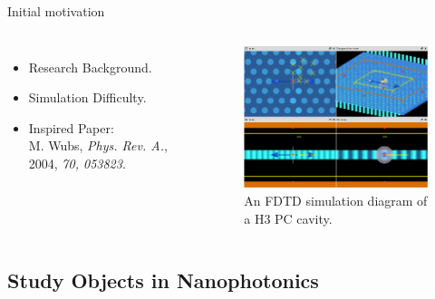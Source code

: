 \documentclass{beamer}
\begin{document}
\begin{frame}{Initial motivation}
\begin{columns}
  \begin{itemize}
  \item
    Research Background.
  \item
    Simulation Difficulty.
  \item
    Inspired Paper: \\ M. Wubs, \textit{Phys. Rev. A.}, 2004, \textit{70, 053823}.
  \end{itemize}
 
  \begin{figure}[htp]%
  \centering
  \begin{center}
  \includegraphics[width=6cm]{./Figs/FDTDsimulation}%
  \end{center}
  \caption[An FDTD simulation diagram of a H3 PC cavity.]{An FDTD simulation diagram of a H3 PC cavity.}
  \label{FDTDsimulation}
  \end{figure}
\end{columns}
\end{frame}

\subsection{Study Objects in Nanophotonics}
\end{document}
